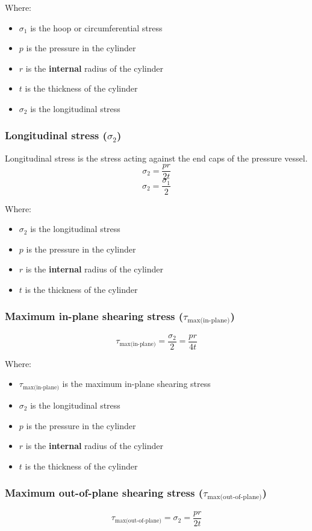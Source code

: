 \documentclass[11pt]{article}
\begin{document}
Where:
\begin{itemize}
\item \(\sigma_1\) is the hoop or circumferential stress
\item \(p\) is the pressure in the cylinder
\item \(r\) is the \textbf{internal} radius of the cylinder
\item \(t\) is the thickness of the cylinder
\item \(\sigma_2\) is the longitudinal stress
\end{itemize}

\subsubsection{Longitudinal stress (\(\sigma_2\))}
\label{sec:orgf46cfd2}
Longitudinal stress is the stress acting against the end caps of the pressure vessel.
\[\sigma_2 = \frac{pr}{2t}\]
\[\sigma_2 = \frac{\sigma_1}{2}\]

Where:
\begin{itemize}
\item \(\sigma_2\) is the longitudinal stress
\item \(p\) is the pressure in the cylinder
\item \(r\) is the \textbf{internal} radius of the cylinder
\item \(t\) is the thickness of the cylinder
\end{itemize}

\subsubsection{Maximum in-plane shearing stress (\(\tau_{\text{max(in-plane)}}\))}
\label{sec:org2fe723e}
\[\tau_{\text{max(in-plane)}} = \frac{\sigma_2}{2} = \frac{pr}{4t}\]

Where:
\begin{itemize}
\item \(\tau_{\text{max(in-plane)}}\) is the maximum in-plane shearing stress
\item \(\sigma_2\) is the longitudinal stress
\item \(p\) is the pressure in the cylinder
\item \(r\) is the \textbf{internal} radius of the cylinder
\item \(t\) is the thickness of the cylinder
\end{itemize}

\subsubsection{Maximum out-of-plane shearing stress (\(\tau_{\text{max(out-of-plane)}}\))}
\label{sec:orgd652576}
\[\tau_{\text{max(out-of-plane)}} = \sigma_2 = \frac{pr}{2t}\]
\end{document}

